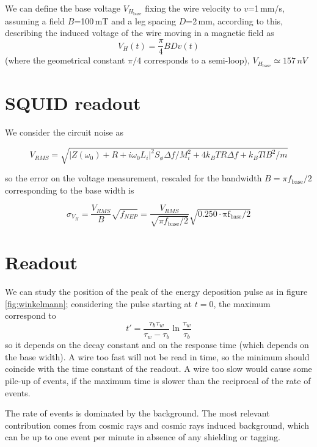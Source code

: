 \documentclass[a4paper,12pt]{article}
\begin{document}
We can define the base voltage $V_{H_{\mathrm{base}}}$ fixing the wire velocity to $v$=1\,mm/s, assuming a field $B$=100\,mT and a leg spacing $D$=2\,mm, according to this, describing the induced voltage of the wire moving in a magnetic field as
\begin{equation}
V_H(t) = \frac{\pi}{4} B D v(t)
\end{equation}
(where the geometrical constant $\pi/4$ corresponds to a semi-loop), $V_{H_{\mathrm{base}}} \simeq 157\,nV$ 


\section{SQUID readout}
We consider the circuit noise as

\begin{equation}
V_{RMS}  = \sqrt{\big|Z(\omega_0) + R + i\omega_0 L_i\big|^2 S_\phi \Delta f / M_i^2 + 4 k_B T R \Delta f + k_B T l B^2 / m}
\end{equation}

so the error on the voltage measurement, rescaled for the bandwidth $B = \pi f_\mathrm{base}/2$ corresponding to the base width is

\begin{equation}
\sigma_{V_H} = \frac{V_{RMS}}{B}\sqrt{f_{NEP}} = \frac{V_{RMS}}{\sqrt{\pi f_\mathrm{base}/2}} \sqrt{\mathrm{0.250 \cdot \pi f_\mathrm{base}/2}}
\end{equation}



\section{Readout}

We can study the position of the peak of the energy deposition pulse as in figure \ref{fig:winkelmann}; considering the pulse starting at $t=0$, the maximum correspond to
\begin{equation}
t' = \frac{\tau_b \tau_w}{\tau_w - \tau_b} \ln \frac{\tau_w}{\tau_b}
\end{equation}
so it depends on the decay constant and on the response time (which depends on the base width).
A wire too fast will not be read in time, so the minimum should coincide with the time constant of the readout.
A wire too slow would cause some pile-up of events, if the maximum time is slower than the reciprocal of the rate of events.

The rate of events is dominated by the background. The most relevant contribution comes from cosmic rays and cosmic rays induced background, which can be up to one event per minute in absence of any shielding or tagging.
\end{document}
